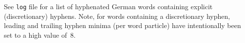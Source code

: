 \documentclass{article}
\begin{document}
See \texttt{log} file for a list of hyphenated German words containing
explicit (discretionary) hyphens.  Note, for words containing a
discretionary hyphen, leading and trailing hyphen minima (per word
particle) have intentionally been set to a high value of~8.

\begin{otherlanguage}{ngerman}
\end{otherlanguage}
\end{document}
